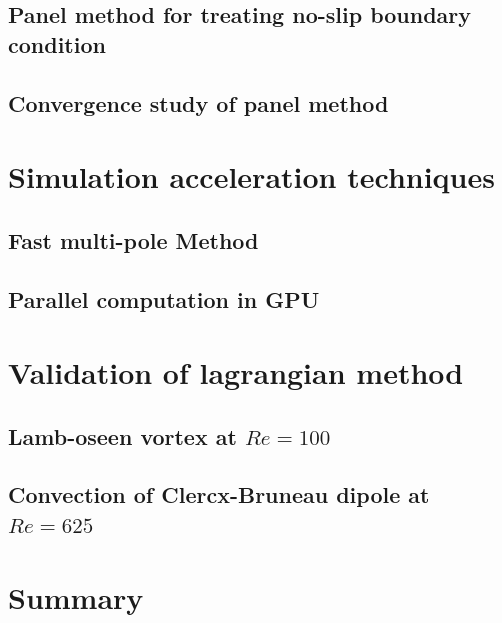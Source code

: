 \subsection{Panel method for treating no-slip boundary condition}

\subsection{Convergence study of panel method}

\section{Simulation acceleration techniques}

\subsection{Fast multi-pole Method}

\subsection{Parallel computation in GPU}

\section{Validation of lagrangian method}

\subsection{Lamb-oseen vortex at $Re=100$}

\subsection{Convection of Clercx-Bruneau dipole at $Re=625$}

\section{Summary}



%
%
%
%
